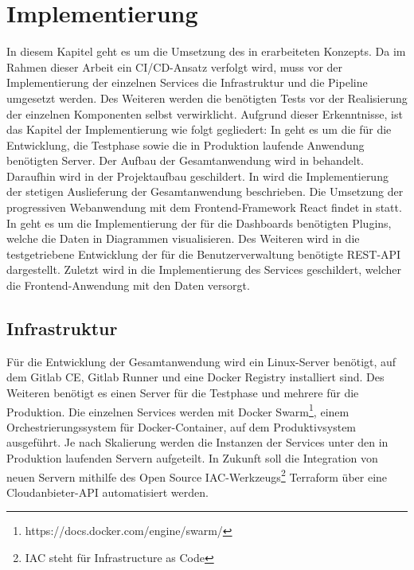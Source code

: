 \chapter{Implementierung}
\label{chap:implementierung}
In diesem Kapitel geht es um die Umsetzung des in  erarbeiteten
Konzepts. Da im Rahmen dieser Arbeit ein CI/CD-Ansatz verfolgt wird, muss vor der Implementierung
der einzelnen Services die Infrastruktur und die Pipeline umgesetzt werden. 
Des Weiteren werden die benötigten Tests vor der Realisierung der einzelnen Komponenten selbst verwirklicht.
Aufgrund dieser Erkenntnisse, ist das Kapitel der Implementierung wie
folgt gegliedert: In  geht es um
die für die Entwicklung, die Testphase sowie die in Produktion laufende Anwendung
benötigten Server. Der Aufbau der Gesamtanwendung wird in  behandelt.
Daraufhin wird in  der Projektaufbau geschildert.
In  wird die Implementierung der stetigen
Auslieferung der Gesamtanwendung beschrieben. Die Umsetzung der
progressiven \mbox{Webanwendung} mit dem Frontend-Framework React
findet in  statt. In  geht es um die
Implementierung der für die Dashboards benötigten Plugins, welche die Daten
in Diagrammen visualisieren. Des Weiteren wird in 
die testgetriebene Entwicklung der für die Benutzerverwaltung benötigte REST-API dargestellt.
Zuletzt wird in  die Implementierung
des Services geschildert, welcher die Frontend-Anwendung mit den Daten versorgt.

\section{Infrastruktur}
\label{sec:infrastruktur}
Für die Entwicklung der Gesamtanwendung wird ein Linux-Server benötigt, auf dem Gitlab CE,
Gitlab Runner und eine Docker Registry installiert sind. Des Weiteren benötigt es einen
Server für die Testphase und mehrere für die Produktion. Die einzelnen
Services werden mit Docker Swarm\footnote{https://docs.docker.com/engine/swarm/},
einem Orchestrierungssystem für Docker-Container, auf dem Produktivsystem ausgeführt. Je nach Skalierung
werden die Instanzen der Services unter den in Produktion laufenden Servern aufgeteilt.
In Zukunft soll die Integration von neuen Servern mithilfe des Open Source IAC-Werkzeugs\footnote{IAC steht für Infrastructure as Code}
Terraform über eine Cloudanbieter-API automatisiert werden.

